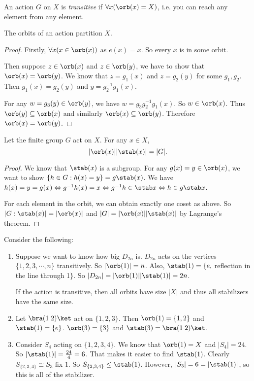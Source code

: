 \documentclass[a4pape]{article}
\begin{document}
\begin{defi}
  An action $G$ on $X$ is \emph{transitive} if $\forall x(\orb(x) = X)$, i.e. you can reach any element from any element.
\end{defi}

\begin{lemma}
  The orbits of an action partition $X$.
\end{lemma}

\begin{proof}
  Firstly, $\forall x(x\in \orb (x))$ as $e(x) = x$. So every $x$ is in some orbit.

  Then suppose $z\in \orb (x)$ and $z\in \orb (y)$, we have to show that $\orb(x) = \orb (y)$. We know that $z = g_1(x)$ and $z = g_2(y)$ for some $g_1, g_2$. Then $g_1(x) = g_2(y)$ and $y = g_2^{-1}g_1(x)$.

  For any $w = g_3(y)\in \orb (y)$, we have $w = g_3g_2^{-1}g_1(x)$. So $w\in \orb (x)$. Thus $\orb (y) \subseteq \orb (x)$ and similarly $\orb (x) \subseteq \orb (y)$. Therefore $\orb (x) = \orb (y)$.
\end{proof}

\begin{thm}
  Let the finite group $G$ act on $X$. For any $x\in X$,
  \[
  |\orb(x)||\stab(x)| = |G|.
  \]
\end{thm}

\begin{proof}
  We know that $\stab(x)$ is a subgroup. For any $g(x) = y\in \orb(x)$, we want to show $\{h\in G: h(x) = y\} = g\stab (x)$. We have $h(x) = y = g(x) \Leftrightarrow g^{-1}h(x) = x \Leftrightarrow g^{-1}h\in \stab x \Leftrightarrow h\in g\stab x$.

  For each element in the orbit, we can obtain exactly one coset as above. So $|G: \stab (x)| = |\orb (x)|$ and $|G| = |\orb (x)||\stab(x)|$ by Lagrange's theorem.
\end{proof}

\begin{eg}
  Consider the following:
  \begin{enumerate}
  \item Suppose we want to know how big $D_{2n}$ is. $D_{2n}$ acts on the vertices $\{1, 2, 3, \cdots, n\}$ transitively. So $|\orb(1)| = n$. Also, $\stab(1) =\{e, $ reflection in the line through 1$\}$. So $|D_{2n}| = |\orb(1)||\stab(1)| = 2n$.

    \note If the action is transitive, then all orbits have size $|X|$ and thus all stabilizers have the same size.
  \item Let $\bra (1\; 2)\ket$ act on $\{1, 2, 3\}$. Then $\orb(1) = \{1, 2\}$ and $\stab(1) = \{e\}$. $\orb(3) = \{3\}$ and $\stab(3) = \bra(1\; 2)\ket$.
  \item Consider $S_4$ acting on $\{1, 2, 3, 4\}$. We know that $\orb(1) = X$ and $|S_4| = 24$. So $|\stab(1)| = \frac{24}{4} = 6$. That makes it easier to find $\stab(1)$. Clearly $S_{\{2, 3, 4\}} \cong S_3$ fix $1$. So $S_{\{2, 3, 4\}}\leq \stab(1)$. However, $|S_3| = 6 = |\stab(1)|$, so this is all of the stabilizer.
  \end{enumerate}
\end{eg}
\end{document}
